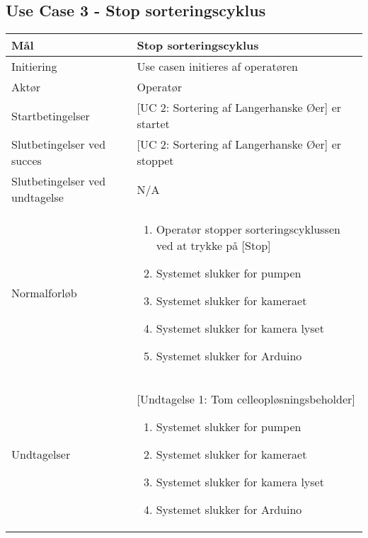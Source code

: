 \subsection{Use Case 3 - Stop sorteringscyklus}
\begin{center}
		\begin{longtable}{ | m{4cm} | m{8cm}| } 
			\hline
			Mål & Stop sorteringscyklus \\ 
			\hline
			Initiering &  Use casen initieres af operatøren\\
			\hline
			Aktør & Operatør \\ 
			\hline
			Startbetingelser & [UC 2: Sortering af Langerhanske Øer] er startet\\ 
			\hline	
			Slutbetingelser ved succes & [UC 2: Sortering af Langerhanske Øer] er stoppet \\
			\hline
			Slutbetingelser ved undtagelse & N/A \\
			\hline
			Normalforløb & \begin{enumerate}
				\setlength\itemsep{0cm} %
				\item Operatør stopper sorteringscyklussen ved at trykke på [Stop]
				\subitem [Undtagelse 1: Tom celleopløsningsbeholder]
				\item Systemet slukker for pumpen
				\item Systemet slukker for kameraet
				\item Systemet slukker for kamera lyset
				\item Systemet slukker for Arduino
			\end{enumerate} \\ 
			\hline
			Undtagelser & [Undtagelse 1: Tom celleopløsningsbeholder]
			
			\begin{enumerate}
			\item Systemet slukker for pumpen
			\item Systemet slukker for kameraet
			\item Systemet slukker for kamera lyset
			\item Systemet slukker for Arduino
			\end{enumerate} \\
			\hline
		\end{longtable}
		
	\end{center}
	\pagebreak